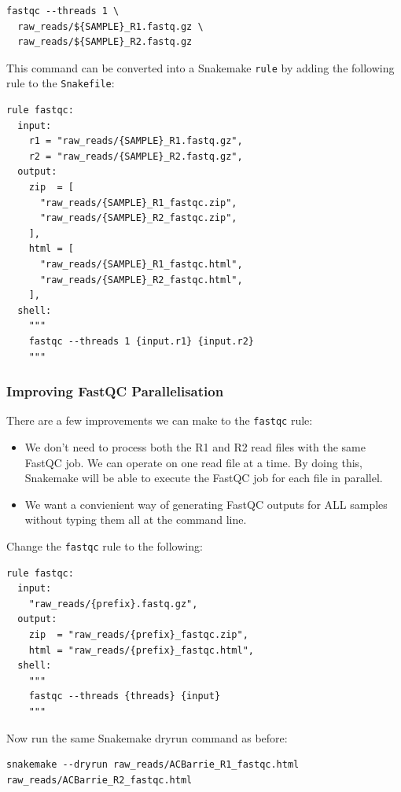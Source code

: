 \begin{lstlisting}
fastqc --threads 1 \
  raw_reads/${SAMPLE}_R1.fastq.gz \
  raw_reads/${SAMPLE}_R2.fastq.gz
\end{lstlisting}

This command can be converted into a Snakemake \texttt{rule} by adding the following rule to the \texttt{Snakefile}:

\begin{lstlisting}
rule fastqc:
  input:
    r1 = "raw_reads/{SAMPLE}_R1.fastq.gz",
    r2 = "raw_reads/{SAMPLE}_R2.fastq.gz",
  output:
    zip  = [
      "raw_reads/{SAMPLE}_R1_fastqc.zip",
      "raw_reads/{SAMPLE}_R2_fastqc.zip",
    ],
    html = [
      "raw_reads/{SAMPLE}_R1_fastqc.html",
      "raw_reads/{SAMPLE}_R2_fastqc.html",
    ],
  shell:
    """
    fastqc --threads 1 {input.r1} {input.r2}
    """
\end{lstlisting}

\subsubsection{Improving FastQC Parallelisation}

There are a few improvements we can make to the \texttt{fastqc} rule:

\begin{itemize}
  \item We don't need to process both the R1 and R2 read files with the same FastQC job.
	We can operate on one read file at a time.
        By doing this, Snakemake will be able to execute the FastQC job for each file in parallel.
  \item We want a convienient way of generating FastQC outputs for ALL samples without typing them all at the command line.
\end{itemize}

Change the \texttt{fastqc} rule to the following:

\begin{lstlisting}
rule fastqc:
  input:
    "raw_reads/{prefix}.fastq.gz",
  output:
    zip  = "raw_reads/{prefix}_fastqc.zip",
    html = "raw_reads/{prefix}_fastqc.html",
  shell:
    """
    fastqc --threads {threads} {input}
    """
\end{lstlisting}

Now run the same Snakemake dryrun command as before:

\begin{lstlisting}
snakemake --dryrun raw_reads/ACBarrie_R1_fastqc.html raw_reads/ACBarrie_R2_fastqc.html
\end{lstlisting}


